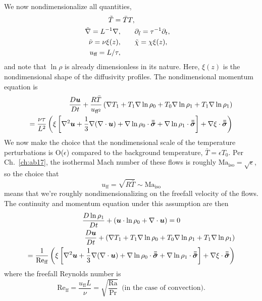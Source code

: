 We now nondimensionalize all quantities, 
\begin{equation}
\begin{split}
\td{T} =  \bar{T} T, \\
\td{\grad} = L^{-1}\grad,  		\qquad &\partial_{\td{t}} = \tau^{-1}\partial_t, \\
\td{\nu} = \nu\xi(z),				\qquad &\td{\chi} = \chi\xi(z),\\
u_{\ff} = L/\tau, \qquad &%
\end{split}
\end{equation}
and note that $\ln\rho$ is already dimensionless in its nature.
Here, $\xi(z)$ is the nondimensional shape of the diffusivity profiles.
The nondimensional momentum equation is
\begin{equation}
\begin{split}
\frac{D \bm{u}}{Dt} + \frac{ R \bar{T}}{u_{\text{ff}^2}} \left( \nabla T_1 + T_1 \nabla \ln\rho_0 + T_0 \nabla \ln\rho_1 + T_1 \nabla\ln\rho_1\right)
\\
= \frac{\nu \tau}{L^2}\left( \xi\left[\nabla^2\bm{u} + \frac{1}{3}\nabla(\nabla\cdot\bm{u}) + \nabla\ln\rho_0\cdot\bm{\bar{\bar{\sigma}}} + \nabla\ln\rho_1\cdot\bm{\bar{\bar{\sigma}}}\right] + \nabla\xi\cdot\bm{\bar{\bar{\sigma}}}\right)
\end{split}
\end{equation}
We now make the choice that the nondimensional scale of the temperature perturbations is O($\epsilon$) compared to the background temperature, $\bar{T} = \epsilon T_0$.
Per Ch.~\ref{ch:ab17}, the isothermal Mach number of these flows is roughly $\text{Ma}_{\text{iso}} = \sqrt{\epsilon}$, so the choice that
$$
u_{\text{ff}}= \sqrt{R \bar{T}} \sim \text{Ma}_{\text{iso}} 
$$
means that we're roughly nondimensionalizing on the freefall velocity of the flows.
The continuity and momentum equation under this assumption are then
\begin{gather}
\frac{D \ln\rho_1}{Dt} + (\bm{u}\cdot\ln\rho_0 + \nabla\cdot\bm{u}) = 0 \\
\begin{split}
\frac{D \bm{u}}{Dt} + \left( \nabla T_1 + T_1 \nabla \ln\rho_0 + T_0 \nabla \ln\rho_1 + T_1 \nabla\ln\rho_1\right)
\\
= \frac{1}{\text{Re}_{\text{ff}}}\left( \xi\left[\nabla^2\bm{u} + \frac{1}{3}\nabla(\nabla\cdot\bm{u}) + \nabla\ln\rho_0\cdot\bm{\bar{\bar{\sigma}}} + \nabla\ln\rho_1\cdot\bm{\bar{\bar{\sigma}}}\right] + \nabla\xi\cdot\bm{\bar{\bar{\sigma}}}\right)
\end{split}
\end{gather}
where the freefall Reynolds number is
$$
\text{Re}_{\text{ff}} = \frac{u_{\text{ff}} L}{\nu} = \sqrt{\frac{\text{Ra}}{\text{Pr}}}\,\,\,\text{(in the case of convection)}.
$$
